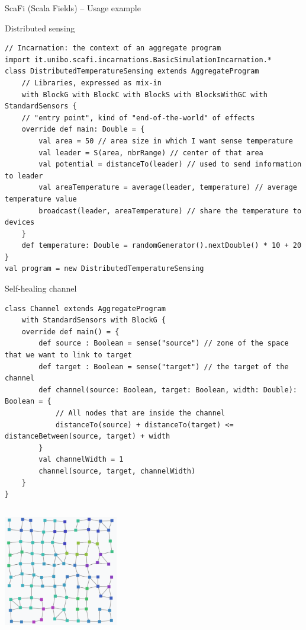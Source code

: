 \documentclass[presentation, 9pt]{beamer}\mode<presentation>{\usetheme{AMSBolognaFC}}
\begin{document}
\begin{frame}{ScaFi (Scala Fields) -- Usage example}
	\begin{alertblock}{Distributed sensing}
		\begin{tcolorbox}[left=0pt, top=0pt, bottom=0pt]
			\begin{verbatim}
// Incarnation: the context of an aggregate program
import it.unibo.scafi.incarnations.BasicSimulationIncarnation.*
class DistributedTemperatureSensing extends AggregateProgram
	// Libraries, expressed as mix-in
	with BlockG with BlockC with BlockS with BlocksWithGC with StandardSensors { 
	// "entry point", kind of "end-of-the-world" of effects
	override def main: Double = {
		val area = 50 // area size in which I want sense temperature
		val leader = S(area, nbrRange) // center of that area
		val potential = distanceTo(leader) // used to send information to leader
		val areaTemperature = average(leader, temperature) // average temperature value
		broadcast(leader, areaTemperature) // share the temperature to devices
	}
	def temperature: Double = randomGenerator().nextDouble() * 10 + 20
}
val program = new DistributedTemperatureSensing
			\end{verbatim}
		\end{tcolorbox}
	\end{alertblock}
\centering
	\begin{alertblock}{Self-healing channel}
		\begin{tcolorbox}[left=0pt, top=0pt, bottom=0pt]
			\begin{verbatim}
class Channel extends AggregateProgram 
	with StandardSensors with BlockG {
	override def main() = {
		def source : Boolean = sense("source") // zone of the space that we want to link to target
		def target : Boolean = sense("target") // the target of the channel
		def channel(source: Boolean, target: Boolean, width: Double): Boolean = {
			// All nodes that are inside the channel
			distanceTo(source) + distanceTo(target) <= distanceBetween(source, target) + width
		}
		val channelWidth = 1
		channel(source, target, channelWidth)
	}
}
			\end{verbatim}
		\end{tcolorbox}
	\end{alertblock}
\framebreak
\begin{columns}
	\begin{column}[c]{0.4\textwidth}
		\includegraphics[width=5cm]{img/temperature.png}

\end{column}
\end{columns}
\end{frame}
\end{document}
